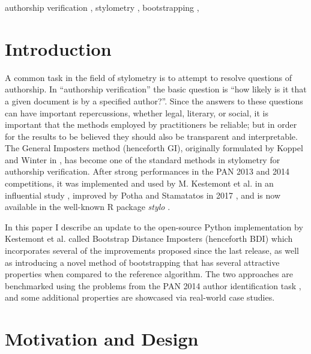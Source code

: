 \documentclass[
    hf
]{ceurart}
\begin{document}
\begin{keywords}
    authorship verification \sep
    stylometry \sep
    bootstrapping \sep
\end{keywords}

\maketitle

\section{Introduction}

A common task in the field of stylometry is to attempt to resolve questions of authorship. In
``authorship verification'' the basic question is ``how likely is it that a given document is by a
specified author?''. Since the answers to these questions can have important repercussions, whether
legal, literary, or social, it is important that the methods employed by practitioners be reliable;
but in order for the results to be believed they should also be transparent and interpretable. The
General Imposters method (henceforth GI), originally formulated by Koppel and Winter in
\cite{koppel_gi}, has become one of the standard methods in stylometry for authorship verification.
After strong performances in the PAN 2013 and 2014 competitions, it was implemented and used by M.
Kestemont et al. in an influential study \cite{kestemont_caesar}, improved by Potha and Stamatatos
in 2017 \cite{potha_improved_gi}, and is now available in the well-known R package \emph{stylo}
\cite{stylo}.

In this paper I describe an update to the open-source Python implementation by Kestemont et al.
\cite{kestemont_ruzicka} called Bootstrap Distance Imposters (henceforth BDI) which incorporates
several of the improvements proposed since the last release, as well as introducing a novel method
of bootstrapping that has several attractive properties when compared to the reference algorithm.
The two approaches are benchmarked using the problems from the PAN 2014 author identification task
\cite{pan_2014}, and some additional properties are showcased via real-world case studies.

\section{Motivation and Design}
\end{document}
